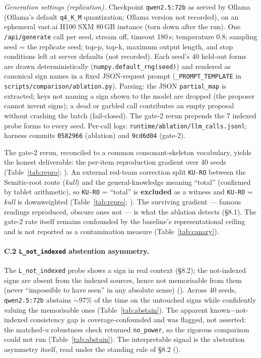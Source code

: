 \emph{Generation settings (replication).} Checkpoint \texttt{qwen2.5:72b}
as served by Ollama (Ollama's default \texttt{q4\_K\_M} quantization;
Ollama version not recorded), on an ephemeral vast.ai H100 SXM 80\,GB
instance (torn down after the run). One \texttt{/api/generate} call per
seed, stream off, timeout 180\,s; temperature 0.8; sampling seed = the
replicate seed; top-p, top-k, maximum output length, and stop conditions
left at server defaults (not recorded). Each
seed's 40 held-out forms are drawn deterministically
(\texttt{numpy.default\_rng(seed)}) and rendered
as canonical sign names in a fixed JSON-request prompt
(\texttt{\_PROMPT\_TEMPLATE} in
\texttt{scripts/\allowbreak comparison/\allowbreak ablation.py}). Parsing:
the JSON \texttt{partial\_map} is extracted; keys not naming a sign shown
to the model are dropped (the proposer cannot invent signs); a dead or
garbled call contributes an empty proposal without crashing the batch
(fail-closed). The gate-2 rerun
prepends the 7 indexed probe forms to every seed. Per-call logs:
\texttt{runtime/ablation/llm\_calls.jsonl}; harness commits
\texttt{0582966} (ablation) and \texttt{9cd6d04} (gate-2).

The gate-2 rerun, reconciled to a common consonant-skeleton vocabulary,
yields the honest deliverable: the per-item reproduction gradient over 40
seeds (Table~\ref{tab:repro}; \artref). An
external red-team correction split \texttt{KU-RO} between the
Semitic-root route (\emph{kull}) and the general-knowledge meaning
``total'' (confirmed by tablet arithmetic), so \texttt{KU-RO} = ``total''
is \textbf{excluded} as a witness and \texttt{KU-RO} = \emph{kull} is
downweighted (Table~\ref{tab:repro}; \artref). The surviving gradient ---
famous readings reproduced, obscure ones not --- is what the ablation
detects (\S8.1). The gate-2 rate itself remains confounded by the baseline's
representational ceiling and is not reported as a contamination measure
(Table~\ref{tab:canary}).

\paragraph{C.2 \texttt{L\_not\_indexed} abstention asymmetry.} The
\texttt{L\_not\_indexed} probe shows a sign in real context (\S8.2); the
not-indexed signs are absent from the indexed
sources, hence not memorisable from them (never ``impossible to have seen''
in any absolute sense) (\artref). Across 40 seeds, \texttt{qwen2.5:72b}
abstains $\sim$97\% of
the time on the untouched signs while confidently valuing the memorisable
ones (Table~\ref{tab:abstain}). The apparent known$-$not-indexed
consistency gap is coverage-confounded and was flagged, not asserted: the
matched-\emph{n} robustness check returned \texttt{no\_power}, so the
rigorous comparison could not run (Table~\ref{tab:abstain}).
The interpretable signal is the abstention asymmetry itself, read under
the standing rule of \S8.2 (\artref).


